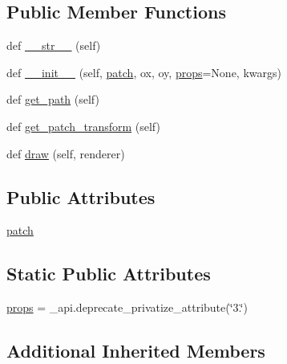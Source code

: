 \subsection*{Public Member Functions}
\begin{DoxyCompactItemize}
\item 
def \hyperlink{classmatplotlib_1_1patches_1_1Shadow_a16aa376b197d2117653be092c1028c1e}{\+\_\+\+\_\+str\+\_\+\+\_\+} (self)
\item 
def \hyperlink{classmatplotlib_1_1patches_1_1Shadow_a5dca0810c2f39a86d49af3dad3820c17}{\+\_\+\+\_\+init\+\_\+\+\_\+} (self, \hyperlink{classmatplotlib_1_1patches_1_1Shadow_a0402714658fa204e27f74a6b1382a73a}{patch}, ox, oy, \hyperlink{classmatplotlib_1_1patches_1_1Shadow_a1b05ddbf77330ce533e6bb14ffb25e49}{props}=None, kwargs)
\item 
def \hyperlink{classmatplotlib_1_1patches_1_1Shadow_ac360cefacc9ac091bd79e292371c202c}{get\+\_\+path} (self)
\item 
def \hyperlink{classmatplotlib_1_1patches_1_1Shadow_a22bfbe0ae4d66af012492a24aecdffff}{get\+\_\+patch\+\_\+transform} (self)
\item 
def \hyperlink{classmatplotlib_1_1patches_1_1Shadow_a10970f55ece6c3d3b32d0231d7aae8f4}{draw} (self, renderer)
\end{DoxyCompactItemize}
\subsection*{Public Attributes}
\begin{DoxyCompactItemize}
\item 
\hyperlink{classmatplotlib_1_1patches_1_1Shadow_a0402714658fa204e27f74a6b1382a73a}{patch}
\end{DoxyCompactItemize}
\subsection*{Static Public Attributes}
\begin{DoxyCompactItemize}
\item 
\hyperlink{classmatplotlib_1_1patches_1_1Shadow_a1b05ddbf77330ce533e6bb14ffb25e49}{props} = \+\_\+api.\+deprecate\+\_\+privatize\+\_\+attribute(\char`\"{}3.\char`\"{})
\end{DoxyCompactItemize}
\subsection*{Additional Inherited Members}


